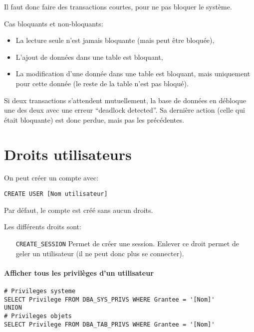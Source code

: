 \documentclass[10pt,a4paper,french]{article}
\begin{document}
Il faut donc faire des transactions courtes, pour ne pas bloquer le système.

Cas bloquants et non-bloquants:
\begin{itemize}
\item La lecture seule n'est jamais bloquante (mais peut être bloquée),
\item L'ajout de données dans une table est bloquant, \hfill {}
\item La modification d'une donnée dans une table est bloquant, mais uniquement pour cette donnée (le reste de la table n'est pas bloqué). \hfill {}
\end{itemize}
Si deux transactions s'attendent mutuellement, la base de données en débloque une des deux avec une erreur ``deadlock detected''. Sa dernière action (celle qui était bloquante) est donc perdue, mais pas les précédentes.

\section{Droits utilisateurs}

On peut créer un compte avec:
\begin{verbatim}
CREATE USER [Nom utilisateur]
\end{verbatim}

Par défaut, le compte est créé sans aucun droits.

Les différents droits sont:
\begin{itemize}
\item[\tt CREATE\_SESSION] Permet de créer une session. Enlever ce droit permet de geler un utilisateur (il ne peut donc plus se connecter).
\end{itemize}

\paragraph{Afficher tous les privilèges d'un utilisateur}
\begin{verbatim}
# Privileges systeme
SELECT Privilege FROM DBA_SYS_PRIVS WHERE Grantee = '[Nom]'
UNION
# Privileges objets
SELECT Privilege FROM DBA_TAB_PRIVS WHERE Grantee = '[Nom]'
\end{verbatim}
\end{document}
